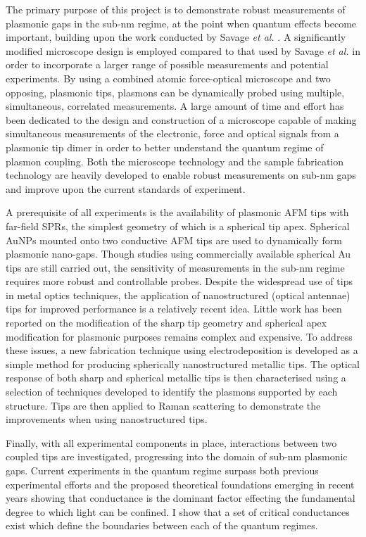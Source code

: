 \documentclass[12pt, a4paper, twoside]{book}
\begin{document}
The primary purpose of this project is to demonstrate robust measurements of plasmonic gaps in the sub-nm regime, at the point when quantum effects become important, building upon the work conducted by Savage \textit{et al.} \cite{savage2012}. A significantly modified microscope design is employed compared to that used by Savage \textit{et al.} in order to incorporate a larger range of possible measurements and potential experiments. By using a combined atomic force-optical microscope and two opposing, plasmonic tips, plasmons can be dynamically probed using multiple, simultaneous, correlated measurements. A large amount of time and effort has been dedicated to the design and construction of a microscope capable of making simultaneous measurements of the electronic, force and optical signals from a plasmonic tip dimer in order to better understand the quantum regime of plasmon coupling. Both the microscope technology and the sample fabrication technology are heavily developed to enable robust measurements on sub-nm gaps and improve upon the current standards of experiment.

A prerequisite of all experiments is the availability of plasmonic AFM tips with far-field SPRs, the simplest geometry of which is a spherical tip apex. Spherical AuNPs mounted onto two conductive AFM tips are used to dynamically form plasmonic nano-gaps. Though studies using commercially available spherical Au tips are still carried out, the sensitivity of measurements in the sub-nm regime requires more robust and controllable probes. Despite the widespread use of tips in metal optics techniques, the application of nanostructured (optical antennae) tips for improved performance is a relatively recent idea. Little work has been reported on the modification of the sharp tip geometry and spherical apex modification for plasmonic purposes remains complex and expensive. To address these issues, a new fabrication technique using electrodeposition is developed as a simple method for producing spherically nanostructured metallic tips. The optical response of both sharp and spherical metallic tips is then characterised using a selection of techniques developed to identify the plasmons supported by each structure. Tips are then applied to Raman scattering to demonstrate the improvements when using nanostructured tips.

Finally, with all experimental components in place, interactions between two coupled tips are investigated, progressing into the domain of sub-nm plasmonic gaps. Current experiments in the quantum regime surpass both previous experimental efforts and the proposed theoretical foundations emerging in recent years showing that conductance is the dominant factor effecting the fundamental degree to which light can be confined. I show that a set of critical conductances exist which define the boundaries between each of the quantum regimes.
\end{document}
